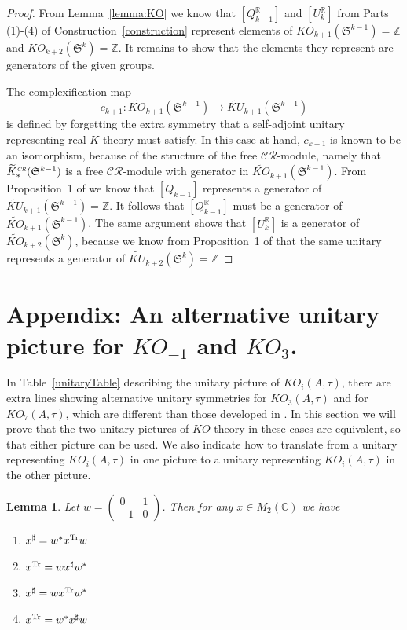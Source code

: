 \documentclass[12pt, reqno]{amsart}
\newtheorem{lemma}[thm]{Lemma}
\theoremstyle{definition}
\def\R{{\mathbb R}}
\def\C{{\mathbb C}}
\def\Z{{\mathbb Z}}
\def\pr{^{\scriptscriptstyle \R}}
\def\crr{^{\scriptscriptstyle {\it CR}}}
\newcommand{\fS}{\mathfrak S}
\begin{document}
\begin{proof}
From Lemma~\ref{lemma:KO} we know that $[Q\pr_{k-1}]$ and $[U\pr_k]$ from Parts (1)-(4) of Construction~\ref{construction} represent elements of $KO_{k+1}(\fS^{k-1}) = \Z$ and $KO_{k+2}(\fS^k) = \Z$. It remains to show that the elements they represent are generators of the given groups.

The complexification map 
$$c_{k+1} \colon \widetilde{KO}_{k+1}(\fS^{k-1}) \rightarrow \widetilde{KU}_{k+1}(\fS^{k-1})$$ is defined by forgetting the extra symmetry that a self-adjoint unitary representing real $K$-theory must satisfy. In this case at hand, $c_{k+1}$ is known to be an isomorphism, because of the structure of the free $\mathcal{CR}$-module, namely that
$\widetilde{K}_*\crr(\fS^{k-1})$ is a free $\mathcal{CR}$-module with generator in $\widetilde{KO}_{k+1}(\fS^{k-1})$.
From Proposition~1 of \cite{SBS} we know that $[Q_{k-1}]$ represents a generator of 
$\widetilde{KU}_{k+1}(\fS^{k-1}) = \Z$. It follows that
$[Q\pr_{k-1}]$ must be a generator of $\widetilde{KO}_{k+1}(\fS^{k-1})$. 
The same argument shows that
$[U\pr_k]$ is a generator of $\widetilde{KO}_{k+2}(\fS^{k})$, because we know from Proposition~1 of \cite{SBS} that the same unitary represents a generator of $\widetilde{KU}_{k+2}(\fS^{k}) = \Z$
\end{proof}

\section{Appendix: An alternative unitary picture for $KO_{-1}$ and $KO_3$.} \label{newunitaries}

In Table~\ref{unitaryTable} describing the unitary picture of $KO_i(A, \tau)$, there are extra lines showing alternative unitary symmetries for $KO_{3}(A, \tau)$ and for $KO_{7}(A, \tau)$, which are different than those developed in \cite{BL}. In this section we will prove that the two unitary pictures of $KO$-theory in these cases are equivalent, so that either picture can be used. We also indicate how to translate from a unitary representing $KO_i(A, \tau)$ in one picture to a unitary representing $KO_i(A, \tau)$ in the other picture.

\begin{lemma}
Let $w = \left( \begin{smallmatrix} 0 & 1 \\ -1 & 0 \end{smallmatrix} \right)$. Then for any $x \in M_2(\C)$ we have 
\begin{enumerate}
\item $x^\sharp = w^* x^{\rm{Tr}} w$ 
\item $x^{\rm{Tr}} = w x^{\sharp} w^*$
\item $x^\sharp = w x^{\rm{Tr}} w^*$ 
\item $x^{\rm{Tr}} = w^* x^{\sharp} w$
\end{enumerate} \end{lemma}
\end{document}
